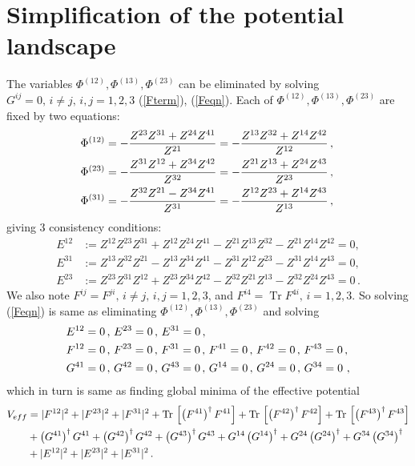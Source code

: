 \documentclass[12pt,a4paper]{JHEP3}
\newcommand{\refb}[1]{(\ref{#1})}
\newcommand{\Tr}{\mathop{\mathrm{Tr}}}
\newcommand{\nn}{\ensuremath{\nonumber{}}}
\begin{document}
\section{Simplification of the potential landscape} \label{appsimple}
The variables $\Phi^{(12)} , \Phi^{(13)} , \Phi^{(23)}$ can be  eliminated by solving $G^{ij}=0 , \, i \neq j, \, i,j=1,2,3$ \refb{Fterm}, \refb{Feqn}. 
Each of $\Phi^{(12)} , \Phi^{(13)} , \Phi^{(23)} $ are fixed by two equations: 
\begin{align}
\nn
\Phi^{(12)} &= - \frac{Z^{23} Z^{31} + Z^{24} Z^{41}}{Z^{21}} = - \frac{Z^{13} Z^{32} + Z^{14} Z^{42}}{Z^{12}} \, , \,\\
\nn
\Phi^{(23)} &= - \frac{Z^{31} Z^{12} + Z^{34} Z^{42}}{Z^{32}} = - \frac{Z^{21} Z^{13} + Z^{24} Z^{43}}{Z^{23}} \, , \, \\
\Phi^{(31)} &= - \frac{Z^{32} Z^{21} - Z^{34} Z^{41}}{Z^{31}} = - \frac{Z^{12} Z^{23} + Z^{14} Z^{43}}{Z^{13}}  \, , \label{phifix}
\end{align}
giving 3 consistency conditions:
\begin{align}
E^{12} &:= Z^{12} Z^{23} Z^{31} + Z^{12} Z^{24} Z^{41} - Z^{21} Z^{13} Z^{32} - Z^{21} Z^{14} Z^{42} =0 ,  \\
\nonumber
E^{31} &:= Z^{13} Z^{32} Z^{21} - Z^{13} Z^{34} Z^{41} - Z^{31} Z^{12} Z^{23} - Z^{31} Z^{14} Z^{43} =0 ,  \\
\nonumber
E^{23} &:= Z^{23} Z^{31} Z^{12} + Z^{23} Z^{34} Z^{42} - Z^{32} Z^{21} Z^{13} - Z^{32} Z^{24} Z^{43} =0 \, . 
\end{align}
We  also note $F^{ij} = F^{ji}, \, i \neq j , \, i,j=1,2,3$, and $F^{i4} = \Tr{} F^{4i}, \, i=1,2,3$. So solving \refb{Feqn} is same as eliminating  $\Phi^{(12)} , \Phi^{(13)} , \Phi^{(23)}$ and solving  
\begin{align}
\nn
E^{12} &= 0 \, , \, E^{23} = 0 \, , \, E^{31} = 0 \, , \\
\nn
F^{12} &= 0 \, , \, F^{23} = 0 \, , \, F^{31} = 0 \, , \, F^{41} = 0 \, , \, F^{42} = 0 \, , \, F^{43} = 0 \, ,\\
G^{41} &= 0 \, , \, G^{42} = 0 \, , \, G^{43} = 0 \, , \, G^{14} = 0 \, , \, G^{24} = 0 \, , \, G^{34} = 0 \, \, ,  \label{effeqn}
\end{align}
which in turn is same as finding global minima of the effective potential
\begin{align}
\nn
V_{eff} &= |F^{12}|^2 +  |F^{23}|^2 +  |F^{31}|^2 + \Tr{} \left[ \left( F^{41} \right)^\dagger  F^{41} \right]   + \Tr{} \left[ \left( F^{42} \right)^\dagger  F^{42} \right]
+ \Tr{} \left[ \left( F^{43} \right)^\dagger  F^{43} \right] \\
\nn
&+  \left( G^{41} \right)^\dagger  G^{41} +  \left( G^{42} \right)^\dagger  G^{42} +  \left( G^{43} \right)^\dagger  G^{43}  
+  G^{14}  \left( G^{14} \right)^\dagger +  G^{24}  \left( G^{24} \right)^\dagger +  G^{34}  \left( G^{34} \right)^\dagger \\
&+  |E^{12}|^2 +  |E^{23}|^2 +  |E^{31}|^2 \, . \label{Vfsimple}
\end{align}
\end{document}
